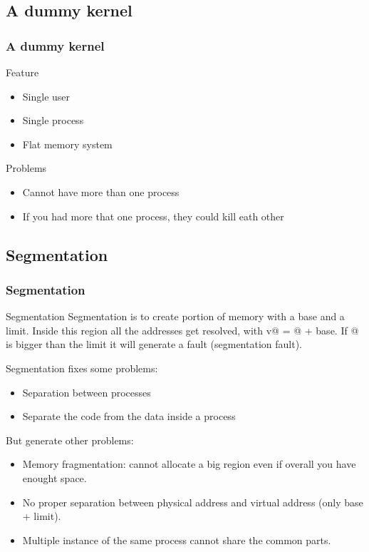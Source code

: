 \subsection{A dummy kernel}
\begin{frame}
        \frametitle{A dummy kernel}
        \begin{block}{Feature}
        \begin{itemize}
                \item Single user
                \item Single process
                \item Flat memory system 
        \end{itemize}
        \end{block}

        \begin{block}{Problems}
                \begin{itemize}
                        \item Cannot have more than one process
                        \item If you had more that one process, they could kill eath other
                \end{itemize}
        \end{block}
\end{frame}

\subsection{Segmentation}
\begin{frame}
        \frametitle{Segmentation}
        
        \begin{block}{Segmentation}
        Segmentation is to create portion of memory with a base and a limit.
        Inside this region all the addresses get resolved, with v@ = @ + base.
        If @ is bigger than the limit it will generate a fault (segmentation fault).
        \end{block}

        Segmentation fixes some problems: 
        \begin{itemize}
                \item Separation between processes 
                \item Separate the code from the data inside a process
        \end{itemize}
        
        But generate other problems:
        \begin{itemize}
                \item Memory fragmentation: cannot allocate a big region even if overall you have enought space.
                \item No proper separation between physical address and virtual address (only base + limit).
                \item Multiple instance of the same process cannot share the common parts.
        \end{itemize}
\end{frame}


